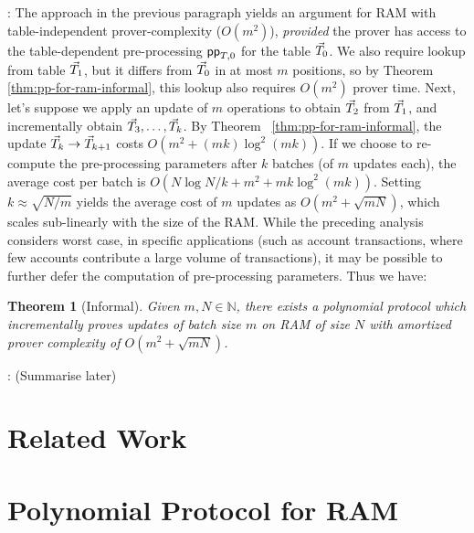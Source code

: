 \documentclass[11pt]{article}
\newtheorem{theorem}{Theorem}[section]
\begin{document}
    : The approach in the previous paragraph yields an argument for RAM with
    table-independent prover-complexity ($O(m^2)$), {\em provided} the prover has access to the table-dependent pre-processing
    $\mathsf{pp}_{T,0}$ for the table $\vec{T}_0$. We also require lookup from table $\vec{T}_1$, but it differs from $\vec{T}_0$ in at most $m$
    positions, so by Theorem \ref{thm:pp-for-ram-informal}, this lookup also requires $O(m^2)$ prover time. Next, let's suppose we apply an
    update of $m$ operations to obtain $\vec{T}_2$ from $\vec{T}_1$, and incrementally obtain $\vec{T}_3,\ldots,\vec{T}_k$. By Theorem ~\ref{thm:pp-for-ram-informal},
    the update $\vec{T}_k\rightarrow \vec{T}_{k+1}$ costs $O(m^2 + (mk)\log^2(mk))$. If we choose to re-compute the pre-processing parameters after $k$
    batches (of $m$ updates each), the average cost per batch is $O(N\log N/k + m^2 + mk\log^2(mk))$. Setting $k\approx \sqrt{N/m}$ yields the
    average cost of $m$ updates as $O(m^2+\sqrt{mN})$, which scales sub-linearly with the size of the RAM. While the preceding analysis considers
    worst case, in specific applications (such as account transactions, where few accounts contribute a large volume of transactions), it may be
    possible to further defer the computation of pre-processing parameters. Thus we have:

    \begin{theorem}[Informal]\label{thm:inc-ver-ram-informal}
    Given $m,N\in \mathbb{N}$, there exists a polynomial protocol which incrementally proves updates of batch size $m$ on RAM of size $N$
    with amortized prover complexity of $O(m^2 + \sqrt{mN})$.
    \end{theorem}

    

    : (Summarise later)

    \section{Related Work}\label{sec:rel-work}

    \section{Polynomial Protocol for RAM}\label{sec:poly-proto-ram}
    




    
    
\end{document}
